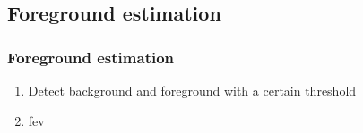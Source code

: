 \subsection{Foreground estimation}

\begin{frame}
  \frametitle{Foreground estimation}
\begin{enumerate}
\item Detect background and foreground with a certain threshold
\item fev
\end{enumerate}
\end{frame}
